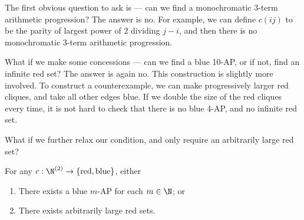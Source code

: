 \documentclass[a4paper]{article}
\begin{document}
The first obvious question to ask is --- can we find a monochromatic 3-term arithmetic progression? The answer is no. For example, we can define $c(ij)$ to be the parity of largest power of $2$ dividing $j - i$, and then there is no monochromatic $3$-term arithmetic progression.

What if we make some concessions --- can we find a blue 10-AP, or if not, find an infinite red set? The answer is again no. This construction is slightly more involved. To construct a counterexample, we can make progressively larger red cliques, and take all other edges blue. If we double the size of the red cliques every time, it is not hard to check that there is no blue 4-AP, and no infinite red set.
\begin{center}
\end{center}
What if we further relax our condition, and only require an arbitrarily large red set?
\begin{thm}
  For any $c: \N^{(2)} \to \{\mathrm{red}, \mathrm{blue}\}$, either
  \begin{enumerate}
    \item There exists a blue $m$-AP for each $m \in \N$; or
    \item There exists arbitrarily large red sets.
  \end{enumerate}
\end{thm}
\end{document}
